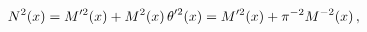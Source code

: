 \[{\mathop{N\/}\nolimits^{2}}\!\left(x\right)={\mathop{M\/}\nolimits'^{2}}\!%
\left(x\right)+{\mathop{M\/}\nolimits^{2}}\!\left(x\right){\mathop{\theta\/}%
\nolimits'^{2}}\!\left(x\right)={\mathop{M\/}\nolimits'^{2}}(x)+\pi^{-2}{%
\mathop{M\/}\nolimits^{-2}}\!\left(x\right),\]